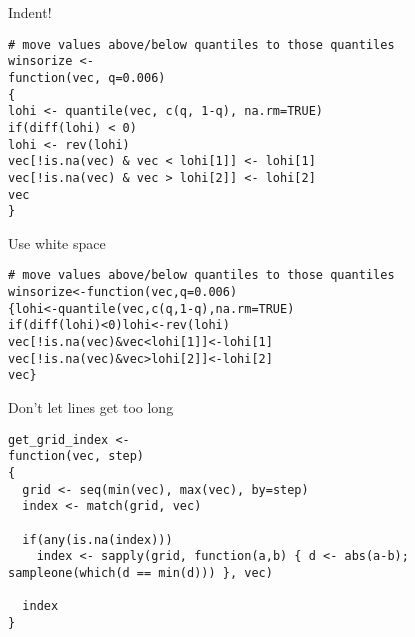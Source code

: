 \documentclass[12pt,t]{beamer}
\begin{document}
\begin{frame}[fragile,c]{Indent!}

\begin{lstlisting}
# move values above/below quantiles to those quantiles
winsorize <- 
function(vec, q=0.006)
{
lohi <- quantile(vec, c(q, 1-q), na.rm=TRUE)
if(diff(lohi) < 0)
lohi <- rev(lohi)
vec[!is.na(vec) & vec < lohi[1]] <- lohi[1]
vec[!is.na(vec) & vec > lohi[2]] <- lohi[2]
vec
}
\end{lstlisting}

\end{frame}



\begin{frame}[fragile,c]{Use white space}

\begin{lstlisting}
# move values above/below quantiles to those quantiles
winsorize<-function(vec,q=0.006)
{lohi<-quantile(vec,c(q,1-q),na.rm=TRUE)
if(diff(lohi)<0)lohi<-rev(lohi)
vec[!is.na(vec)&vec<lohi[1]]<-lohi[1]
vec[!is.na(vec)&vec>lohi[2]]<-lohi[2]
vec}
\end{lstlisting}

\end{frame}


\begin{frame}[fragile,c]{Don't let lines get too long}

\begin{lstlisting}
get_grid_index <-
function(vec, step)
{
  grid <- seq(min(vec), max(vec), by=step)
  index <- match(grid, vec)

  if(any(is.na(index)))
    index <- sapply(grid, function(a,b) { d <- abs(a-b); sampleone(which(d == min(d))) }, vec)

  index
}
\end{lstlisting}


\end{frame}
\end{document}
